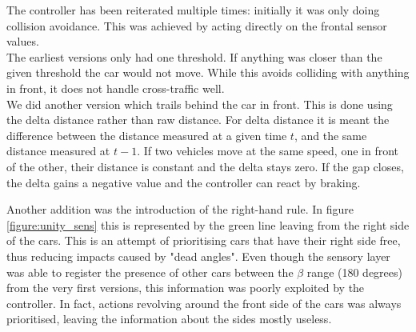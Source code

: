 The controller has been reiterated multiple times: initially it was only doing collision avoidance.
This was achieved by acting directly on the frontal sensor values.\\
The earliest versions only had one threshold. If anything was closer than the given threshold the car would not move.
While this avoids colliding with anything in front, it does not handle cross-traffic well.\\
We did another version which trails behind the car in front.
This is done using the delta distance rather than raw distance.
For delta distance it is meant the difference between the distance measured at a given time $t$, and the same distance measured at $t-1$. 
If two vehicles move at the same speed, one in front of the other, their distance is constant and the delta stays zero.
If the gap closes, the delta gains a negative value and the controller can react by braking. 

Another addition was the introduction of the right-hand rule. In figure \ref{figure:unity_sens} this is represented by the green line leaving from the right side of the cars.
This is an attempt of prioritising cars that have their right side free, thus reducing impacts caused by "dead angles".
Even though the sensory layer was able to register the presence of other cars between the $\beta$ range (180 degrees) from the very first versions, this information was poorly exploited by the controller.
In fact, actions revolving around the front side of the cars was always prioritised, leaving the information about the sides mostly useless.
